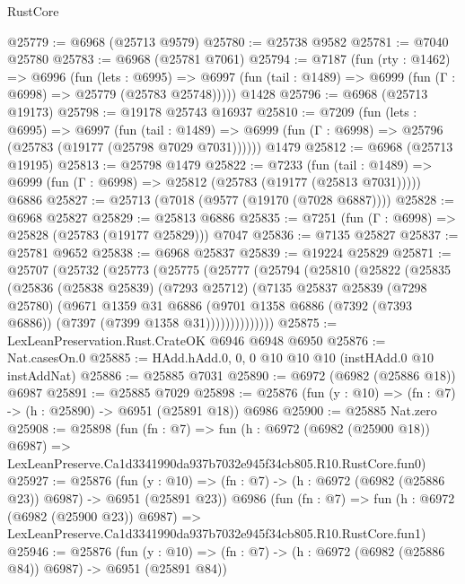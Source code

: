 \begin{lexlean}{RustCore}
\begin{coremodule}
@25779 := @6968 (@25713 @9579)
@25780 := @25738 @9582
@25781 := @7040 @25780
@25783 := @6968 (@25781 @7061)
@25794 := @7187
    (fun (rty : @1462) =>
    @6996
      (fun (lets : @6995) =>
      @6997 (fun (tail : @1489) => @6999 (fun (Γ : @6998) => @25779 (@25783 @25748)))))
    @1428
@25796 := @6968 (@25713 @19173)
@25798 := @19178 @25743 @16937
@25810 := @7209
    (fun (lets : @6995) =>
    @6997
      (fun (tail : @1489) =>
      @6999 (fun (Γ : @6998) => @25796 (@25783 (@19177 (@25798 @7029 @7031))))))
    @1479
@25812 := @6968 (@25713 @19195)
@25813 := @25798 @1479
@25822 := @7233
    (fun (tail : @1489) => @6999 (fun (Γ : @6998) => @25812 (@25783 (@19177 (@25813 @7031)))))
    @6886
@25827 := @25713 (@7018 (@9577 (@19170 (@7028 @6887))))
@25828 := @6968 @25827
@25829 := @25813 @6886
@25835 := @7251 (fun (Γ : @6998) => @25828 (@25783 (@19177 @25829))) @7047
@25836 := @7135 @25827
@25837 := @25781 @9652
@25838 := @6968 @25837
@25839 := @19224 @25829
@25871 := @25707
    (@25732
      (@25773
        (@25775
          (@25777
            (@25794
              (@25810
                (@25822
                  (@25835
                    (@25836
                      (@25838 @25839)
                      (@7293 @25712)
                      (@7135
                        @25837
                        @25839
                        (@7298 @25780)
                        (@9671
                          @1359
                          @31
                          @6886
                          (@9701
                            @1358
                            @6886
                            (@7392 (@7393 @6886))
                            (@7397 (@7399 @1358 @31))))))))))))))
@25875 := LexLeanPreservation.Rust.CrateOK @6946 @6948 @6950
@25876 := Nat.casesOn.{0}
@25885 := HAdd.hAdd.{0, 0, 0} @10 @10 @10 (instHAdd.{0} @10 instAddNat)
@25886 := @25885 @7031
@25890 := @6972 (@6982 (@25886 @18)) @6987
@25891 := @25885 @7029
@25898 := @25876 (fun (y : @10) => (fn : @7) -> (h : @25890) -> @6951 (@25891 @18)) @6986
@25900 := @25885 Nat.zero
@25908 := @25898
    (fun (fn : @7) =>
    fun (h : @6972 (@6982 (@25900 @18)) @6987) =>
    LexLeanPreserve.Ca1d3341990da937b7032e945f34cb805.R10.RustCore.fun0)
@25927 := @25876
    (fun (y : @10) => (fn : @7) -> (h : @6972 (@6982 (@25886 @23)) @6987) -> @6951 (@25891 @23))
    @6986
    (fun (fn : @7) =>
    fun (h : @6972 (@6982 (@25900 @23)) @6987) =>
    LexLeanPreserve.Ca1d3341990da937b7032e945f34cb805.R10.RustCore.fun1)
@25946 := @25876
    (fun (y : @10) => (fn : @7) -> (h : @6972 (@6982 (@25886 @84)) @6987) -> @6951 (@25891 @84))

\end{coremodule}
\end{lexlean}
